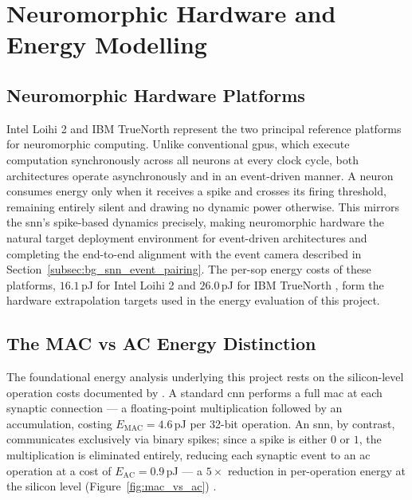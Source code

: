 \section{Neuromorphic Hardware and Energy Modelling}
\label{sec:background_neuromorphic}

\subsection{Neuromorphic Hardware Platforms}

Intel Loihi 2 \cite{gralewicz2024spikes} and IBM TrueNorth \cite{merolla2014million} represent the two principal reference platforms for neuromorphic computing.
Unlike conventional \glspl{gpu}, which execute computation synchronously across all neurons at every clock cycle, both architectures operate asynchronously and in an event-driven manner.
A neuron consumes energy only when it receives a spike and crosses its firing threshold, remaining entirely silent and drawing no dynamic power otherwise.
This mirrors the \gls{snn}'s spike-based dynamics precisely, making neuromorphic hardware the natural target deployment environment for event-driven architectures and completing the end-to-end alignment with the event camera described in Section~\ref{subsec:bg_snn_event_pairing}.
The per-\gls{sop} energy costs of these platforms, $16.1$\,pJ for Intel Loihi 2 \cite{gralewicz2024spikes} and $26.0$\,pJ for IBM TrueNorth \cite{merolla2014million}, form the hardware extrapolation targets used in the energy evaluation of this project.

\subsection{The MAC vs AC Energy Distinction}
\label{subsec:bg_mac_ac}

The foundational energy analysis underlying this project rests on the silicon-level operation costs documented by \textcite{horowitz20141}.
A standard \gls{cnn} performs a full \gls{mac} at each synaptic connection --- a floating-point multiplication followed by an accumulation, costing $E_{\text{MAC}} = 4.6$\,pJ per 32-bit operation.
An \gls{snn}, by contrast, communicates exclusively via binary spikes; since a spike is either $0$ or $1$, the multiplication is eliminated entirely, reducing each synaptic event to an \gls{ac} operation at a cost of $E_{\text{AC}} = 0.9$\,pJ --- a $5\times$ reduction in per-operation energy at the silicon level (Figure~\ref{fig:mac_vs_ac}) \cite{horowitz20141}.

